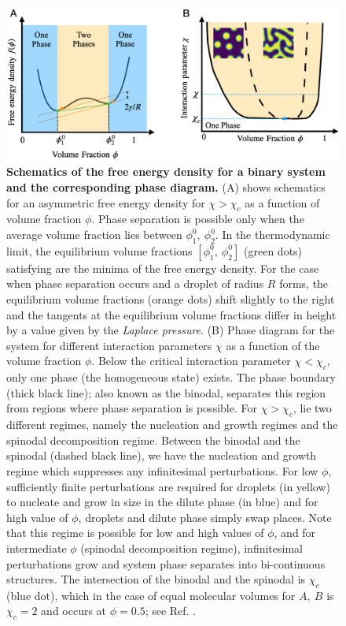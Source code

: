 \begin{figure}[tb]
\centering
\includegraphics[scale=0.52]{MainContent/Figures/free_energy.pdf}
\caption{\textbf{Schematics of the free energy density for a binary system and the corresponding phase diagram.}
(A) shows schematics for an asymmetric free energy density for $\chi > \chi_c$ as a function of volume fraction $\phi$.
Phase separation is possible only when the average volume fraction lies between $\phi^0_1,~\phi^0_2$.
In the thermodynamic limit, the equilibrium volume fractions $[\phi^0_1,~\phi^0_2]$ (green dots) satisfying  are the minima of the free energy density.
For the case when phase separation occurs and a droplet of radius $R$ forms, the equilibrium volume fractions (orange dots) shift slightly to the right and the tangents at the equilibrium volume fractions differ in height by a value given by the \textit{Laplace pressure}.
(B) Phase diagram for the system for different interaction parameters $\chi$ as a function of the volume fraction $\phi$.
Below the critical interaction parameter $\chi < \chi_c$, only one phase (the homogeneous state) exists.
The phase boundary (thick black line); also known as the binodal, separates this region from regions where phase separation is possible.  
For $\chi > \chi_c$, lie two different regimes, namely the nucleation and growth regimes and the spinodal decomposition regime.
Between the binodal and the spinodal (dashed black line), we have the nucleation and growth regime which suppresses any infinitesimal perturbations.
For low $\phi$, sufficiently finite perturbations are required for droplets (in yellow) to nucleate and grow in size in the dilute phase (in blue) and for high value of $\phi$, droplets and dilute phase simply swap places.
Note that this regime is possible for low and high values of $\phi$, and for intermediate $\phi$ (spinodal decomposition regime), infinitesimal perturbations grow and system phase separates into bi-continuous structures.
The intersection of the binodal and the spinodal is $\chi_c$ (blue dot), which in the case of equal molecular volumes for $A,~B$ is $\chi_c = 2$ and occurs at $\phi = 0.5$; see Ref. \cite{Review2019}. 
}
\label{fig:free_energy}
\end{figure}

